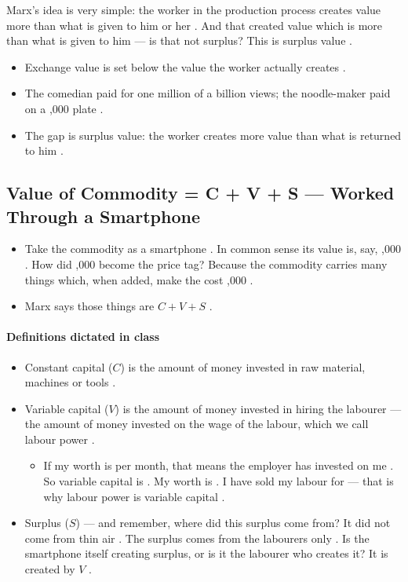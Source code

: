 \begin{KeyConcept}
Marx's idea is very simple: the worker in the production process creates value more than what is given to him or her . And that created value which is more than what is given to him --- is that not surplus? This is surplus value .
\end{KeyConcept}

\begin{QuickRevision}
\begin{itemize}
    \item Exchange value is set below the value the worker actually creates .
    \item The comedian paid for one million of a billion views; the noodle-maker paid  on a ,000 plate .
    \item The gap is surplus value: the worker creates more value than what is returned to him .
\end{itemize}
\end{QuickRevision}

\subsection{Value of Commodity = C + V + S --- Worked Through a Smartphone}
\begin{itemize}
    \item Take the commodity as a smartphone . In common sense its value is, say, ,000 . How did ,000 become the price tag? Because the commodity carries many things which, when added, make the cost ,000 .
    \item Marx says those things are $C + V + S$ .
\end{itemize}

\paragraph{Definitions dictated in class}
\begin{itemize}
    \item Constant capital ($C$) is the amount of money invested in raw material, machines or tools .
    \item Variable capital ($V$) is the amount of money invested in hiring the labourer --- the amount of money invested on the wage of the labour, which we call labour power .
    \begin{itemize}
        \item If my worth is  per month, that means the employer has invested  on me . So variable capital is  . My worth is  . I have sold my labour for  --- that is why labour power is variable capital .
    \end{itemize}
    \item Surplus ($S$) --- and remember, where did this surplus come from? It did not come from thin air . The surplus comes from the labourers only . Is the smartphone itself creating surplus, or is it the labourer who creates it? It is created by $V$ .
\end{itemize}

